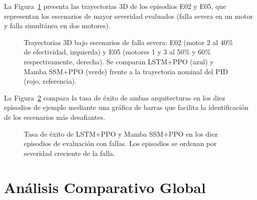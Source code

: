 La Figura~\ref{fig:exp2_trayectorias} presenta las trayectorias 3D de los episodios E02 y E05, que representan los escenarios de mayor severidad evaluados (falla severa en un motor y falla simultánea en dos motores).

\begin{figure}[htbp]
\centering
{}
\caption{Trayectorias 3D bajo escenarios de falla severa: E02 (motor 2 al 40\% de efectividad, izquierda) y E05 (motores 1 y 3 al 50\% y 60\% respectivamente, derecha). Se comparan LSTM+PPO (azul) y Mamba SSM+PPO (verde) frente a la trayectoria nominal del PID (rojo, referencia).}
\label{fig:exp2_trayectorias}
\end{figure}

La Figura~\ref{fig:exp2_barras} compara la tasa de éxito de ambas arquitecturas en los diez episodios de ejemplo mediante una gráfica de barras que facilita la identificación de los escenarios más desafiantes.

\begin{figure}[htbp]
\centering
{}
\caption{Tasa de éxito de LSTM+PPO y Mamba SSM+PPO en los diez episodios de evaluación con fallas. Los episodios se ordenan por severidad creciente de la falla.}
\label{fig:exp2_barras}
\end{figure}


\section{Análisis Comparativo Global}

